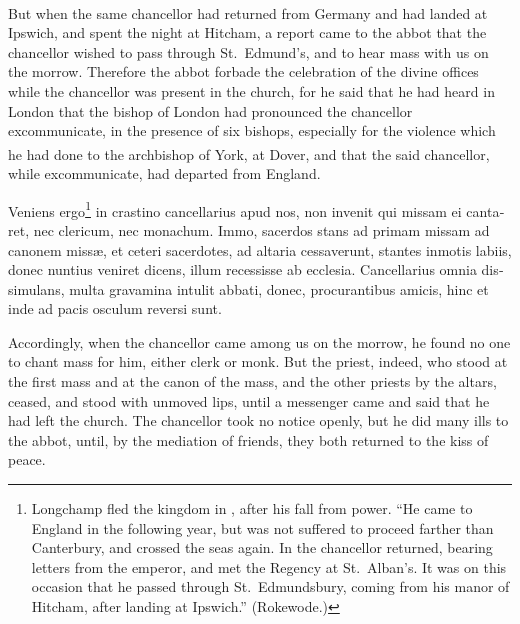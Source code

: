 \documentclass[10pt]{book}
\newcounter{engnote}
\newcommand{\engnotenum}{\textsuperscript{\arabic{engnote}\stepcounter{engnote}}}
\begin{document}
\begin{paracol}{2}
\begin{otherlanguage}{latin}
\end{otherlanguage}

\switchcolumn

But when the same chancellor had returned from Germany\engnotenum{} and had landed at Ipswich, and spent the night at Hitcham, a report came to the abbot that the chancellor wished to pass through St.\ Edmund's, and to hear mass with us on the morrow. Therefore the abbot forbade the celebration of the divine offices while the chancellor was present in the church, for he said that he had heard in London that the bishop of London had pronounced the chancellor excommunicate, in the presence of six bishops, especially for the violence which he had done to the archbishop of York,\engnotenum{} at Dover, and that the said chancellor, while excommunicate, had departed from England.

\switchcolumn*

\begin{otherlanguage}{latin}
Veniens ergo\footnote[\ddag]{Longchamp fled the kingdom in , after his fall from power. ``He came to England in the following year, but was not suffered to proceed farther than Canterbury, and crossed the seas again. In  the chancellor returned, bearing letters from the emperor, and met the Regency at St.\ Alban's. It was on this occasion that he passed through St.\ Edmundsbury, coming from his manor of Hitcham, after landing at Ipswich.'' (Rokewode.)} in crastino cancellarius apud nos, non invenit qui missam ei cantaret, nec clericum, nec monachum. Immo, sacerdos stans ad primam missam ad canonem miss\ae{}, et ceteri sacerdotes, ad altaria cessaverunt, stantes inmotis labiis, donec nuntius veniret dicens, illum recessisse ab ecclesia. Cancellarius omnia dissimulans, multa gravamina intulit abbati, donec, procurantibus amicis, hinc et inde ad pacis osculum reversi sunt.
\end{otherlanguage}

\switchcolumn

Accordingly, when the chancellor came among us on the morrow, he found no one to chant mass for him, either clerk or monk. But the priest, indeed, who stood at the first mass and at the canon of the mass, and the other priests by the altars, ceased, and stood with unmoved lips, until a messenger came and said that he had left the church. The chancellor took no notice openly, but he did many ills to the abbot, until, by the mediation of friends, they both returned to the kiss of peace.


\end{paracol}
\end{document}
